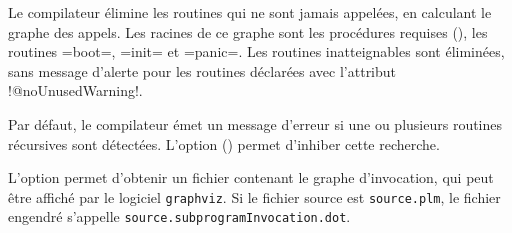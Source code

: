 Le compilateur élimine les routines qui ne sont jamais appelées, en calculant le graphe des appels. Les racines de ce graphe sont les procédures requises (), les routines \plm=boot=, \plm=init= et \plm=panic=. Les routines inatteignables sont éliminées, sans message d'alerte pour les routines déclarées avec l'attribut \plm!@noUnusedWarning!.












Par défaut, le compilateur émet un message d'erreur si une ou plusieurs routines récursives sont détectées. L'option  () permet d'inhiber cette recherche.

L'option  permet d'obtenir un fichier contenant le graphe d'invocation, qui peut être affiché par le logiciel \texttt{graphviz}. Si le fichier source est \texttt{source.plm}, le fichier engendré s'appelle \texttt{source.subprogramInvocation.dot}.

